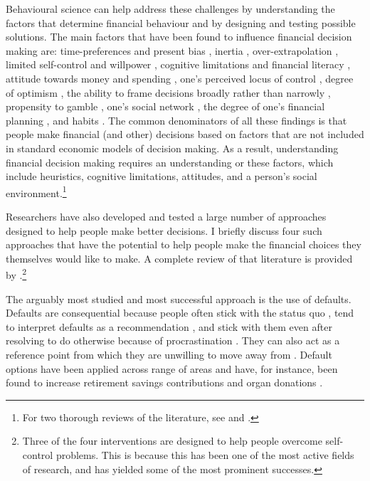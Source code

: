 Behavioural science can help address these challenges by understanding the
factors that determine financial behaviour and by designing and testing
possible solutions. The main factors that have been found to influence
financial decision making are: time-preferences and present bias
\citep{laibson1997golden, frederick2002time, read2018intertemporal,
ericson2019intertemporal, cohen2020measuring}, inertia
\citep{madrian2001power}, over-extrapolation \citep{choi2009reinforcement},
limited self-control and willpower \citep{thaler1981economic,
benhabib2005modeling, fudenberg2006dual, loewenstein2004animal,
gul2001temptation}, cognitive limitations and financial literacy
\citep{agarwal2009age, agarwal2013cognitive, korniotis2011older,
agarwal2010learning, fernandes2014financial, jorring2020financial}, attitude
towards money and spending \citep{rick2008tightwads, rick2011fatal}, one's
perceived locus of control \citep{perry2005control}, degree of optimism
\citep{puri2007optimism}, the ability to frame decisions broadly rather than
narrowly \citep{kumar2008decision}, propensity to gamble
\citep{kumar2009gambles}, one's social network \citep{bailey2018economic,
kuchler2021social}, the degree of one's financial planning
\citep{ameriks2003wealth}, and habits \citep{blumenstock2018defaults,
schaner2018persistent, de2013deposit}. {\color{blue} The common denominators of all these findings is that people make financial (and other) decisions based on factors that are not included in standard economic models of decision making. As a result, understanding financial decision making requires an understanding or these factors, which include heuristics, cognitive limitations, attitudes, and a person's social environment.}\footnote{For two thorough reviews of the
literature, see \citet{agarwal2017shapes} and \citet{greenberg2019financial}.}

Researchers have also developed and tested a large number of approaches
designed to help people make better decisions. I briefly discuss four such approaches
that have the potential to help people make the financial choices they
themselves would like to make. A complete review of that literature is provided
by \citet{duckworth2018beyond}.\footnote{{\color{blue} Three of the four interventions are designed to help people overcome self-control problems. This is because this has been one of the most active fields of research, and has yielded some of the most prominent successes.}}

The arguably most studied and most successful approach is the use of defaults. Defaults are consequential because people often stick
with the status quo \citep{samuelson1988status}, tend to
interpret defaults as a recommendation \citep{mckenzie2006recommendations}, and stick with them even after resolving to do otherwise because of procrastination \citep{carroll2009optimal, ericson2017interaction}. They can also act as a reference point from which they are unwilling to move away from \citep{johnson2003defaults, kahneman1979prospect}. Default options have been
applied across range of areas and have, for instance, been found to increase
retirement savings contributions \citep{thaler2004save, madrian2001power,
beshears2009importance} and organ donations \citep{johnson2003defaults,
gimbel2003presumed, abadie2006impact}.

